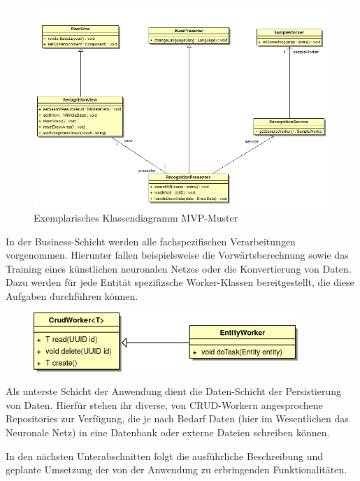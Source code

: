 \begin{figure}[H]
	\centering
	\includegraphics[width=1\textwidth]{Abbildungen/UML/daniel/Klassendiagramm-MVP.png}
	\caption{Exemplarisches Klassendiagramm MVP-Muster}
	\label{mvp-exemplarisch}
\end{figure}


In der Business-Schicht werden alle fachspezifischen Verarbeitungen vorgenommen. Hierunter fallen beispielsweise die Vorwärtsberechnung sowie das Training eines künstlichen neuronalen Netzes oder die Konvertierung von Daten. Dazu werden für jede Entität spezifizsche Worker-Klassen bereitgestellt, die diese Aufgaben durchführen können.

\begin{figure}[H]
\begin{center}
\includegraphics[width=10cm]{Abbildungen/UML/jan/workerClassDiagramm.png}
\end{center}
\end{figure}

Als unterste Schicht der Anwendung dient die Daten-Schicht der Persistierung von Daten. Hierfür stehen ihr diverse, von CRUD-Workern angesprochene Repositories zur Verfügung, die je nach Bedarf Daten (hier im Wesentlichen das Neuronale Netz) in eine Datenbank oder externe Dateien schreiben können.

In den nächsten Unterabschnitten folgt die ausführliche Beschreibung und geplante Umsetzung der von der Anwendung zu erbringenden Funktionalitäten.  

